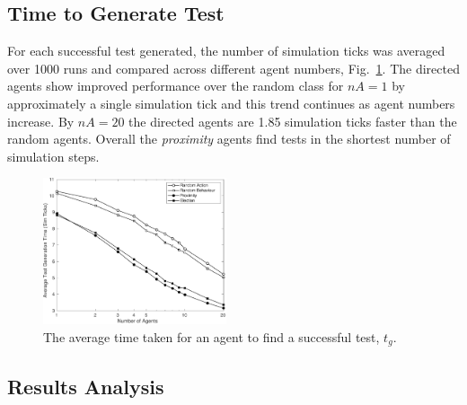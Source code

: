 \documentclass[letterpaper, 10 pt, journal, twoside]{IEEEtran}
\begin{document}
\subsection{Time to Generate Test}
For each successful test generated, the number of simulation ticks was averaged over 1000 runs and compared across different agent numbers, Fig.~\ref{Time}. 
%
The directed agents show improved performance over the random class for $nA=1$ by approximately a single simulation tick and this trend continues as agent numbers increase. By $nA=20$ the directed agents are 1.85 simulation ticks faster than the random agents. Overall the \textit{proximity} agents find tests in the shortest number of simulation steps.

\begin{figure}[!t]
	\centering
\includegraphics[width=0.48\textwidth]{Time.pdf}
	\caption{The average time taken for an agent to find a successful test, $t_{g}$.}
	\label{Time}
\end{figure}




\subsection{Results Analysis}
\end{document}
